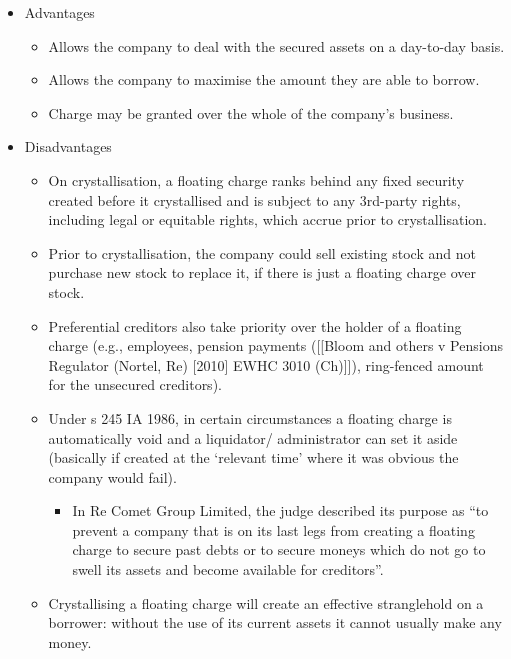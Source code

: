 \documentclass[
]{article}
\providecommand{\tightlist}{%
  \setlength{\itemsep}{0pt}\setlength{\parskip}{0pt}}
\begin{document}
\begin{itemize}
\tightlist
\item
  Advantages

  \begin{itemize}
  \tightlist
  \item
    Allows the company to deal with the secured assets on a day-to-day
    basis.
  \item
    Allows the company to maximise the amount they are able to borrow.
  \item
    Charge may be granted over the whole of the company's business.
  \end{itemize}
\item
  Disadvantages

  \begin{itemize}
  \tightlist
  \item
    On crystallisation, a floating charge ranks behind any fixed
    security created before it crystallised and is subject to any
    3rd-party rights, including legal or equitable rights, which accrue
    prior to crystallisation.
  \item
    Prior to crystallisation, the company could sell existing stock and
    not purchase new stock to replace it, if there is just a floating
    charge over stock.
  \item
    Preferential creditors also take priority over the holder of a
    floating charge (e.g., employees, pension payments ({[}{[}Bloom and
    others v Pensions Regulator (Nortel, Re) {[}2010{]} EWHC 3010
    (Ch){]}{]}), ring-fenced amount for the unsecured creditors).
  \item
    Under s 245 IA 1986, in certain circumstances a floating charge is
    automatically void and a liquidator/ administrator can set it aside
    (basically if created at the `relevant time' where it was obvious
    the company would fail).

    \begin{itemize}
    \tightlist
    \item
      In Re Comet Group Limited, the judge described its purpose as ``to
      prevent a company that is on its last legs from creating a
      floating charge to secure past debts or to secure moneys which do
      not go to swell its assets and become available for creditors''.
    \end{itemize}
  \item
    Crystallising a floating charge will create an effective
    stranglehold on a borrower: without the use of its current assets it
    cannot usually make any money.
  \end{itemize}
\end{itemize}
\end{document}
